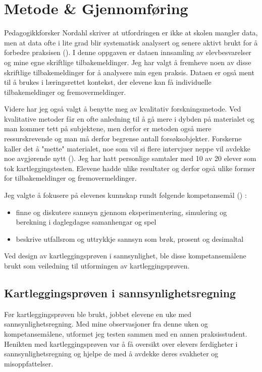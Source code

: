 \documentclass[main.tex]{subfiles}
\begin{document}
\section*{Metode \& Gjennomføring}
\label{sec:2}

Pedagogikkforsker Nordahl skriver at utfordringen er ikke at skolen mangler data, men at data ofte i lite grad blir
systematisk analysert og senere aktivt brukt for å forbedre praksisen ().
I denne oppgaven er dataen innsamling av elevbesvarelser og mine egne skriftlige tilbakemeldinger.
Jeg har valgt å fremheve noen av disse skriftlige tilbakemeldinger for å analysere min egen praksis.
Dataen er også ment til å brukes i læringsrettet kontekst, der elevene kan få individuelle 
tilbakemeldinger og fremovermeldinger. 

Videre har jeg også valgt å benytte meg av kvalitativ forskningsmetode. Ved kvalitative metoder 
får en ofte anledning til å gå mere i dybden på materialet og man kommer tett på subjektene, men derfor er metoden også 
mere ressurskrevende og man må derfor begrense antall forsøksobjekter. Forskerne kaller det å "mette" materialet, noe som 
vil si flere intervjuer neppe vil avdekke noe avgjørende nytt (). Jeg har hatt personlige samtaler med 10 
av 20 elever som tok kartleggingstesten. Elevene hadde ulike resultater og derfor også ulike former for tilbakemeldinger 
og fremovermeldinger.

Jeg valgte å fokusere på elevenes kunnskap rundt følgende kompetansemål \newline
() :
\begin{itemize}
\item finne og diskutere sannsyn gjennom eksperimentering, simulering og berekning i daglegdagse samanhengar og spel
\item beskrive utfallsrom og uttrykkje sannsyn som brøk, prosent og desimaltal
\end{itemize}
Ved design av kartleggingsprøven i sannsynlighet, ble disse kompetansemålene brukt som veiledning til utformingen av 
kartleggingsprøven.

\subsection*{Kartleggingsprøven i sannsynlighetsregning}

Før kartleggingsprøven ble brukt, jobbet elevene en uke med sannsynlighetsregning. Med mine observasjoner fra denne uken 
og kompetansemålene, utformet jeg testen sammen med en annen praksisstudent. Henikten med kartleggingsprøven 
var å få oversikt over elevers ferdigheter i sannsynlighetsregning og hjelpe de med å avdekke deres
svakheter og misoppfattelser. 
\newline
\end{document}
